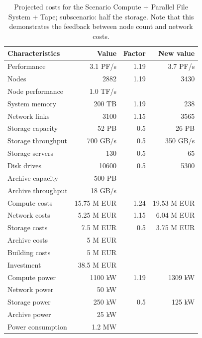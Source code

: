 \documentclass{../../template/esiwace-report}
\begin{document}
\begin{table}
\centering
\begin{tabular}{|l|r|r|r|}
	\hline
	Characteristics    &        Value & Factor & New value \\ \hline
	Performance        &     3.1 PF/s &   1.19 &  3.7 PF/s\\
	Nodes              &         2882 &   1.19 &  3430\\
	Node performance   &     1.0 TF/s &        &  \\
	System memory      &       200 TB &   1.19 &  238\\
	Network links      &         3100 &   1.15 &  3565\\ \hline
	Storage	capacity   &        52 PB &    0.5 &  26 PB\\
	Storage	throughput &     700 GB/s &    0.5 &  350 GB/s\\
	Storage servers    &          130 &    0.5 &  65\\
	Disk drives        &        10600 &    0.5 &  5300\\ \hline
	Archive	capacity   &       500 PB &        &  \\
	Archive	throughput &      18 GB/s &        &  \\ \hline\hline
	Compute costs      & 15.75 M EUR &   1.24 &  19.53 M EUR\\
	Network costs      &  5.25 M EUR &   1.15 &  6.04 M EUR\\
	Storage costs      &   7.5 M EUR &    0.5 &  3.75 M EUR\\
	Archive costs      &     5 M EUR &        &  \\
	Building costs     &     5 M EUR &        &  \\ \hline
	Investment         &  38.5 M EUR &        &  \\ \hline
	Compute power      &      1100 kW &   1.19 &  1309 kW\\
	Network power      &        50 kW &        &  \\
	Storage power      &       250 kW &    0.5 &  125 kW\\
	Archive power      &        25 kW &        &  \\ \hline
	Power consumption  &       1.2 MW &        &  \\ \hline
\end{tabular}
\caption{Projected costs for the Scenario Compute + Parallel File System + Tape; subscenario: half the storage. Note that this demonstrates the feedback between node count and network costs.}
\label{tbl:costsforcomputepfstape}
\end{table}
\end{document}
